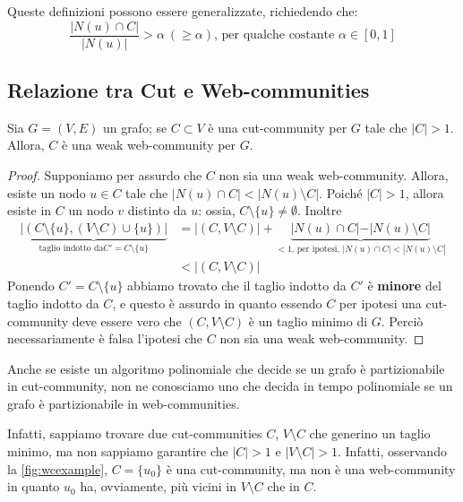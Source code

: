 Queste definizioni possono essere generalizzate, richiedendo che:
\[
\frac{|N(u) \cap C|}{|N(u)|} > \alpha\ (\geq \alpha) \text{, per qualche costante } \alpha \in [0, 1]
\]

\newpage
\subsection{Relazione tra Cut e Web-communities}

\begin{teorema}
    Sia $G = (V, E)$ un grafo; se $C \subset V$ è una cut-community per $G$ tale che $|C| > 1$. Allora, $C$ è una weak web-community per $G$.
\end{teorema}

\begin{proof}
    Supponiamo per assurdo che $C$ non sia una weak web-community. Allora, esiste un nodo $u \in C$ tale che $|N(u) \cap C| < |N(u) \setminus C|$. Poiché $|C| > 1$, allora esiste in $C$ un nodo $v$ distinto da $u$: ossia, $C \setminus \{u\} \neq \emptyset$.
    Inoltre
    \begin{align*}
        \underbrace{\vert (C \setminus \lbrace u \rbrace , (V \setminus C) \cup \lbrace u \rbrace ) \vert}_{\text{taglio indotto da} C' = C \setminus\{u\}}
        &= \vert (C, V \setminus C) \vert + \underbrace{\vert N(u) \cap C \vert - \vert N(u) \setminus C \vert}_{< 1 \text{, per ipotesi, } |N(u) \cap C| < |N(u) \setminus C|}\\
        &< \vert (C, V \setminus C) \vert
    \end{align*}
    Ponendo $C' = C \setminus \{u\}$ abbiamo trovato che il taglio indotto da $C'$ è \textbf{minore} del taglio indotto da $C$, e questo è assurdo in quanto essendo $C$ per ipotesi una cut-community deve essere vero che $(C, V \setminus C)$ è un taglio minimo di $G$. Perciò necessariamente è falsa l'ipotesi che $C$ non sia una weak web-community.
\end{proof}

Anche se esiste un algoritmo polinomiale che decide se un grafo è partizionabile in cut-community, non ne conosciamo uno che decida in tempo polinomiale se un grafo è partizionabile in web-communities.

Infatti, sappiamo trovare due cut-communities $C$, $V \setminus C$ che generino un taglio minimo, ma non sappiamo garantire che $|C| > 1$ e $|V \setminus C| > 1$. Infatti, osservando la \autoref{fig:wcexample}, $C = \{u_0\}$ è una cut-community, ma non è una web-community in quanto $u_0$ ha, ovviamente, più vicini in $V \setminus C$ che in $C$.

